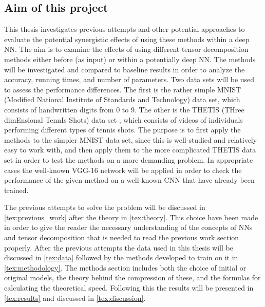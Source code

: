 \subsection{Aim of this project}
This thesis investigates previous attempts and other potential approaches to evaluate the potential synergistic effects of using these methods within a deep NN. The aim is to examine the effects of using different tensor decomposition methods either before (as input) or within a potentially deep NN. The methods will be investigated and compared to baseline results in order to analyze the accuracy, running times, and number of parameters. Two data sets will be used to assess the performance differences. The first is the rather simple MNIST (Modified National Institute of Standards and Technology) data set\cite{MNIST}, which consists of handwritten digits from 0 to 9. The other is the THETIS (THree dimEnsional TennIs Shots) data set \cite{Gourgari2013}, which consists of videos of individuals performing different types of tennis shots. The purpose is to first apply the methods to the simpler MNIST data set, since this is well-studied and relatively easy to work with, and then apply them to the more complicated THETIS data set in order to test the methods on a more demanding problem. In appropriate cases the well-known VGG-16 network will be applied in order to check the performance of the given method on a well-known CNN that have already been trained.

The previous attempts to solve the problem will be discussed in \autoref{tex:previous_work} after the theory in \autoref{tex:theory}. This choice have been made in order to give the reader the necessary understanding of the concepts of NNs and tensor decomposition that is needed to read the previous work section properly. After the previous attempts the data used in this thesis will be discussed in \autoref{tex:data} followed by the methods developed to train on it in \autoref{tex:methodology}. The methods section includes both the choice of initial or original models, the theory behind the compression of these, and the formulas for calculating the theoretical speed. Following this the results will be presented in \autoref{tex:results} and discussed in \autoref{tex:discussion}.